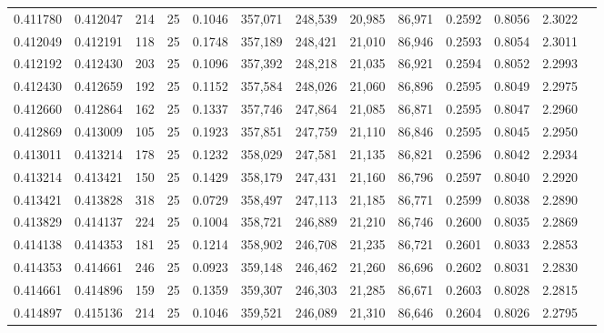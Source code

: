 \begin{tabular}{rrrrrrrrrrrrr}
0.411780 & 0.412047 &   214 &  25 &                                     0.1046 & 357,071 & 248,539 &  20,985 &  86,971 & 0.2592 & 0.8056 & 2.3022 \\
0.412049 & 0.412191 &   118 &  25 &                                     0.1748 & 357,189 & 248,421 &  21,010 &  86,946 & 0.2593 & 0.8054 & 2.3011 \\
0.412192 & 0.412430 &   203 &  25 &                                     0.1096 & 357,392 & 248,218 &  21,035 &  86,921 & 0.2594 & 0.8052 & 2.2993 \\
0.412430 & 0.412659 &   192 &  25 &                                     0.1152 & 357,584 & 248,026 &  21,060 &  86,896 & 0.2595 & 0.8049 & 2.2975 \\
0.412660 & 0.412864 &   162 &  25 &                                     0.1337 & 357,746 & 247,864 &  21,085 &  86,871 & 0.2595 & 0.8047 & 2.2960 \\
0.412869 & 0.413009 &   105 &  25 &                                     0.1923 & 357,851 & 247,759 &  21,110 &  86,846 & 0.2595 & 0.8045 & 2.2950 \\
0.413011 & 0.413214 &   178 &  25 &                                     0.1232 & 358,029 & 247,581 &  21,135 &  86,821 & 0.2596 & 0.8042 & 2.2934 \\
0.413214 & 0.413421 &   150 &  25 &                                     0.1429 & 358,179 & 247,431 &  21,160 &  86,796 & 0.2597 & 0.8040 & 2.2920 \\
0.413421 & 0.413828 &   318 &  25 &                                     0.0729 & 358,497 & 247,113 &  21,185 &  86,771 & 0.2599 & 0.8038 & 2.2890 \\
0.413829 & 0.414137 &   224 &  25 &                                     0.1004 & 358,721 & 246,889 &  21,210 &  86,746 & 0.2600 & 0.8035 & 2.2869 \\
0.414138 & 0.414353 &   181 &  25 &                                     0.1214 & 358,902 & 246,708 &  21,235 &  86,721 & 0.2601 & 0.8033 & 2.2853 \\
0.414353 & 0.414661 &   246 &  25 &                                     0.0923 & 359,148 & 246,462 &  21,260 &  86,696 & 0.2602 & 0.8031 & 2.2830 \\
0.414661 & 0.414896 &   159 &  25 &                                     0.1359 & 359,307 & 246,303 &  21,285 &  86,671 & 0.2603 & 0.8028 & 2.2815 \\
0.414897 & 0.415136 &   214 &  25 &                                     0.1046 & 359,521 & 246,089 &  21,310 &  86,646 & 0.2604 & 0.8026 & 2.2795 \\

\end{tabular}
